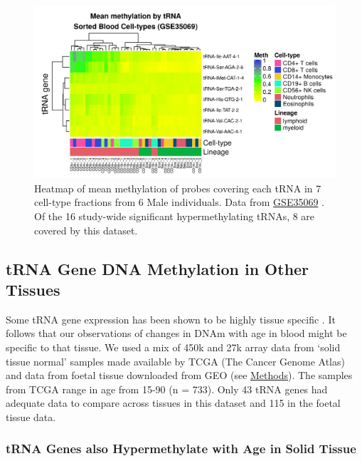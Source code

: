\documentclass[]{book}
\begin{document}
\begin{figure}

{\centering \includegraphics[width=1\linewidth]{./figs/meanMethbytRNAMatLowBB6_bl} 

}

\caption{Heatmap \citep{Gu2016} of mean methylation of probes covering each tRNA in 7 cell-type fractions from 6 Male individuals. Data from \href{https://www.ncbi.nlm.nih.gov/geo/query/acc.cgi?acc=GSE35069}{GSE35069} \citep{Reinius2012}. Of the 16 study-wide significant hypermethylating tRNAs, 8 are covered by this dataset.}\label{fig:meanMethbytRNAMatLowBB6}
\end{figure}



\hypertarget{trna-gene-dna-methylation-in-other-tissues}{%
\subsection{tRNA Gene DNA Methylation in Other Tissues}\label{trna-gene-dna-methylation-in-other-tissues}}

Some tRNA gene expression has been shown to be highly tissue specific \citep{Schmitt2014b, Dittmar2006, Sagi2016}.
It follows that our observations of changes in DNAm with age in blood might be specific to that tissue.
We used a mix of 450k and 27k array data from `solid tissue normal' samples made available by TCGA (The Cancer Genome Atlas) and data from foetal tissue \citep{Yang2016, Nazor2012} downloaded from GEO (see \protect\hyperlink{TCGAmethods}{Methods}).
The samples from TCGA range in age from 15-90 (n = 733).
Only 43 tRNA genes had adequate data to compare across tissues in this dataset and 115 in the foetal tissue data.

\hypertarget{trna-genes-also-hypermethylate-with-age-in-solid-tissue}{%
\subsubsection{tRNA Genes also Hypermethylate with Age in Solid Tissue}\label{trna-genes-also-hypermethylate-with-age-in-solid-tissue}}
\end{document}

